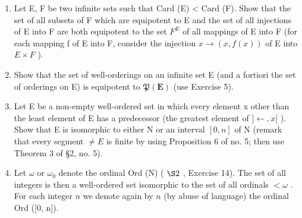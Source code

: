 \begin{enumerate}
\item
  Let E, F be two infinite sets such that Card (E) \textless{} Card (F). Show that the set of all subsets of F which are equipotent to E and the set of all injections of E into F are both equipotent to the set \(F^{E}\) of all mappings of E into F (for each mapping f of E into F, consider the injection \(x \to (x, f(x))\) of E into \(E \times F\) ).
\item
  Show that the set of well-orderings on an infinite set E (and a fortiori the set of orderings on E) is equipotent to \(\mathfrak{P}(\mathbf{E})\) (use Exercise 5).
\item
  Let E be a non-empty well-ordered set in which every element x other than the least element of E has a predecessor (the greatest element of \(] \leftarrow, x[\) ). Show that E is isomorphic to either N or an interval \([0, n]\) of N (remark that every segment \(\neq E\) is finite by using Proposition 6 of no. 5; then use Theorem 3 of §2, no. 5).
\item
  Let \(\omega\) or \(\omega_0\) denote the ordinal Ord (N) ( \(\S 2\) , Exercise 14). The set of all integers is then a well-ordered set isomorphic to the set of all ordinals \(< \omega\) . For each integer \(n\) we denote again by \(n\) (by abuse of language) the ordinal Ord ({[}0, n{]}).
\end{enumerate}

